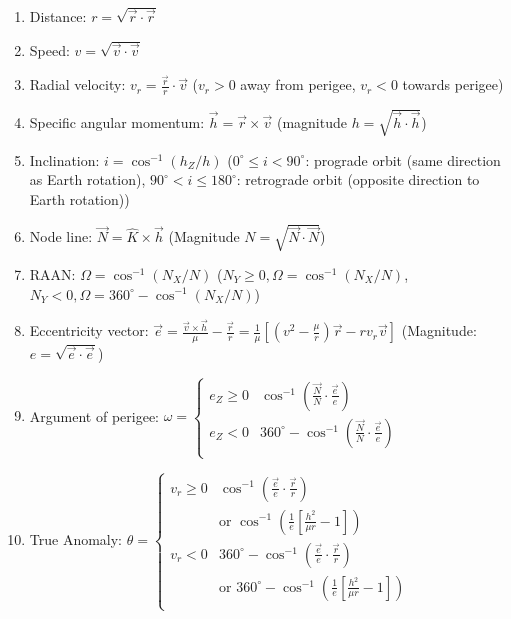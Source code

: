 \documentclass[letterpaper, 8pt]{extarticle}
\begin{document}
\begin{multicols*}{4}
\begin{enumerate}
    \item Distance: $r = \sqrt{\vec{r} \cdot \vec{r}}$
    \item Speed: $v = \sqrt{\vec{v} \cdot \vec{v}}$
    \item Radial velocity: $v_r = \frac{\vec{r}}{r} \cdot \vec{v}$
          ($v_r > 0$ away from perigee, $v_r < 0$ towards perigee)
    \item Specific angular momentum: $\vec{h} = \vec{r} \times \vec{v}$
          (magnitude $h = \sqrt{\vec{h} \cdot \vec{h}}$)
    \item Inclination: $i = \cos^{-1} (h_Z / h)$
        ($0^\circ \leq i < 90^\circ$: prograde orbit (same direction as Earth rotation),
        $90^\circ < i \leq 180^\circ$: retrograde orbit (opposite direction to Earth rotation))
    \item Node line: $\vec{N} = \hat{K} \times \vec{h}$
        (Magnitude $N = \sqrt{\vec{N} \cdot \vec{N}}$)
    \item RAAN: $\Omega = \cos^{-1} (N_X / N)$
        ($N_Y \geq 0, \Omega = \cos^{-1} (N_X / N)$,
        $N_Y < 0, \Omega = 360^\circ - \cos^{-1}(N_X / N)$)
    \item Eccentricity vector: $\vec{e} 
        = \frac{\vec{v} \times \vec{h}}{\mu} - \frac{\vec{r}}{r}
        = \frac{1}{\mu} \left[\left(v^2 - \frac{\mu}{r}\right) \vec{r} - r v_r \vec{v}\right]$
        (Magnitude: $e = \sqrt{\vec{e} \cdot \vec{e}}$)
    \item Argument of perigee: $\omega = 
    \begin{cases}
        e_Z \geq 0 & \cos^{-1} \left(\frac{\vec{N}}{N} \cdot \frac{\vec{e}}{e}\right) \\
        e_Z < 0 & 360^\circ - \cos^{-1} \left(\frac{\vec{N}}{N} \cdot \frac{\vec{e}}{e}\right) \\
    \end{cases}$
    \item True Anomaly: $\theta =
    \begin{cases}
        v_r \geq 0 & \cos^{-1} \left(\frac{\vec{e}}{e} \cdot \frac{\vec{r}}{r}\right) \\
                   & \text{or } \cos^{-1} \left(\frac{1}{e} \left[\frac{h^2}{\mu r} - 1\right]\right) \\
        v_r < 0    & 360^\circ - \cos^{-1} \left(\frac{\vec{e}}{e} \cdot \frac{\vec{r}}{r}\right) \\
                   & \text{or } 360^\circ - \cos^{-1} \left(\frac{1}{e} \left[\frac{h^2}{\mu r} - 1\right]\right) \\
    \end{cases}$
\end{enumerate}


\end{multicols*}
\end{document}

